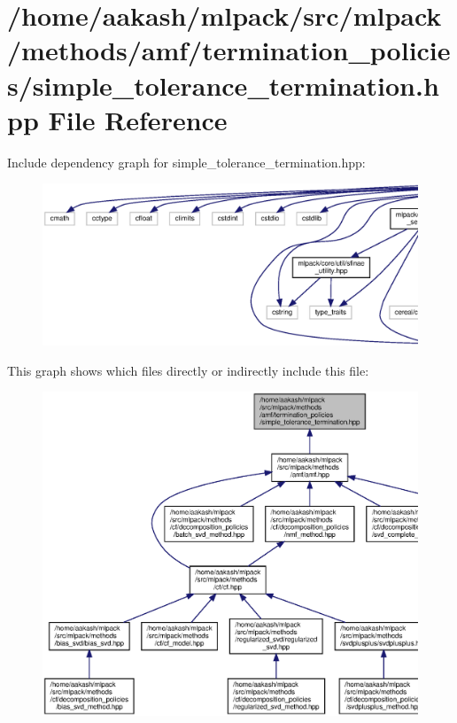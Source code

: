 \section{/home/aakash/mlpack/src/mlpack/methods/amf/termination\+\_\+policies/simple\+\_\+tolerance\+\_\+termination.hpp File Reference}
\label{simple__tolerance__termination_8hpp}
Include dependency graph for simple\+\_\+tolerance\+\_\+termination.\+hpp\+:
\nopagebreak
\begin{figure}[H]
\begin{center}
\leavevmode
\includegraphics[width=350pt]{simple__tolerance__termination_8hpp__incl}
\end{center}
\end{figure}
This graph shows which files directly or indirectly include this file\+:
\nopagebreak
\begin{figure}[H]
\begin{center}
\leavevmode
\includegraphics[width=350pt]{simple__tolerance__termination_8hpp__dep__incl}
\end{center}
\end{figure}
